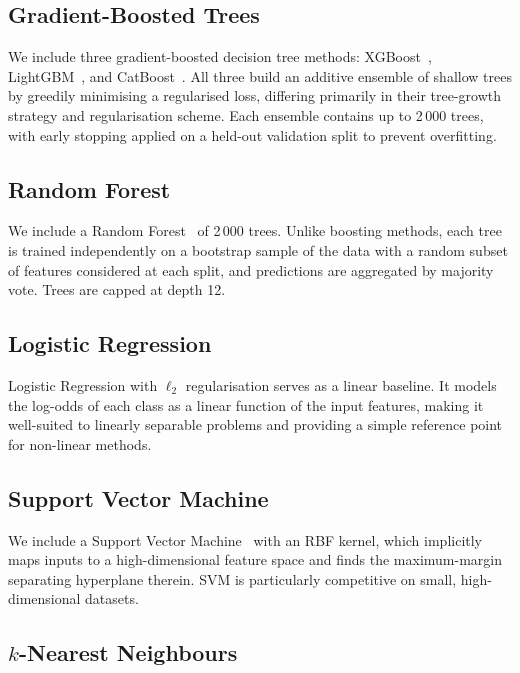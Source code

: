 \documentclass{article}
\begin{document}
\subsection{Gradient-Boosted Trees}

We include three gradient-boosted decision tree methods:
XGBoost~\cite{chenXGBoostScalableTree2016}, LightGBM~\cite{keLightGBMHighlyEfficient2017}, and
CatBoost~\cite{dorogushCatBoostGradientBoosting2018}.  All three build an additive ensemble of
shallow trees by greedily minimising a regularised loss, differing primarily
in their tree-growth strategy and regularisation scheme.  Each ensemble
contains up to 2\,000 trees, with early stopping applied on a held-out
validation split to prevent overfitting.

\subsection{Random Forest}

We include a Random Forest~\cite{breimanRandomForests2001} of 2\,000 trees.
Unlike boosting methods, each tree is trained independently on a bootstrap
sample of the data with a random subset of features considered at each
split, and predictions are aggregated by majority vote.  Trees are capped at
depth 12.

\subsection{Logistic Regression}

Logistic Regression with $\ell_2$ regularisation serves as a linear
baseline.  It models the log-odds of each class as a linear function of the
input features, making it well-suited to linearly separable problems and
providing a simple reference point for non-linear methods.

\subsection{Support Vector Machine}

We include a Support Vector Machine~\cite{cortesSupportvectorNetworks1995} with an RBF
kernel, which implicitly maps inputs to a high-dimensional feature space and
finds the maximum-margin separating hyperplane therein.  SVM is particularly
competitive on small, high-dimensional datasets.

\subsection{$k$-Nearest Neighbours}
\end{document}
